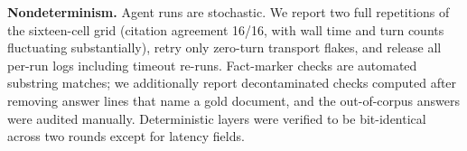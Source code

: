 \noindent\textbf{Nondeterminism.} Agent runs are stochastic. We report two
full repetitions of the sixteen-cell grid (citation agreement 16/16, with wall
time and turn counts fluctuating substantially), retry only zero-turn
transport flakes, and release all per-run logs including timeout re-runs.
Fact-marker checks are automated substring matches; we additionally report
decontaminated checks computed after removing answer lines that name a gold
document, and the out-of-corpus answers were audited manually. Deterministic
layers were verified to be bit-identical across two rounds except for latency
fields.
